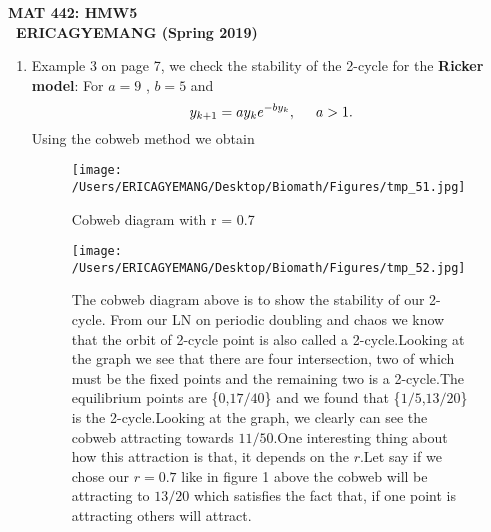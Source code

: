 \documentclass[12pt]{article}
\begin{document}
\begin{center}
\textbf{ MAT 442: HMW5}\\
\textbf{\ ERICAGYEMANG (Spring 2019)}\\
\end{center}

\begin{enumerate} 
\item Example 3 on page 7, we check the stability of the 2-cycle for the \textbf{Ricker model}: For $a=9$ , $b=5$ and \[y_{k+1}=ay_ke^{-by_k},  \hspace{0.5cm}a>1.\]
Using the cobweb method we obtain

\begin{figure} [ht!]
 \centering
 \texttt{[image: /Users/ERICAGYEMANG/Desktop/Biomath/Figures/tmp\_51.jpg]} 
        \caption[Figure 2.4: r>1]{Cobweb diagram with r = 0.7}
 \label{fig::model}
\end{figure}
        
\begin{figure} [ht!]
 \centering
 \texttt{[image: /Users/ERICAGYEMANG/Desktop/Biomath/Figures/tmp\_52.jpg]} 
        \caption[Figure 2.4: r>1]{The cobweb diagram above is to show the stability of our 2-cycle. From our LN on periodic doubling and chaos we know that the orbit of 2-cycle point is also called a 2-cycle.Looking at the graph we see that there are four intersection, two of which must be the fixed points and the remaining two is a 2-cycle.The equilibrium points are \{$0$,$17/40$\} and we found that \{$1/5$,$13/20$\} is the 2-cycle.Looking at the graph, we clearly can see the cobweb attracting towards $11/50$.One interesting thing about how this attraction is that, it depends on the $r$.Let say if we chose our $r=0.7$ like in figure 1 above the cobweb will be attracting to $13/20$ which satisfies the fact that, if one point is attracting others will attract.}
 \label{fig::model}
\end{figure}

\cleardoublepage


\end{enumerate}
\end{document}
